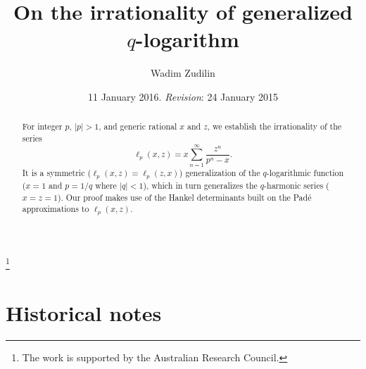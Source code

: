 \documentclass[12pt,reqno]{amsart}
\theoremstyle{remark}
\begin{document}
\title{On the irrationality of generalized $q$-logarithm}

\author{Wadim Zudilin}
\address{School of Mathematical and Physical Sciences, The University of Newcastle, Callaghan NSW 2308, AUSTRALIA}

\date{11 January 2016. \emph{Revision}: 24 January 2015}


\begin{abstract}
For integer $p$, $|p|>1$, and generic rational $x$ and $z$, we establish the irrationality of the series
$$
\ell_p(x,z)=x\sum_{n=1}^\infty\frac{z^n}{p^n-x}.
$$
It is a symmetric ($\ell_p(x,z)=\ell_p(z,x)$) generalization of the $q$-logarithmic function ($x=1$ and $p=1/q$ where $|q|<1$),
which in turn generalizes the $q$-harmonic series ($x=z=1$). Our proof makes use of the Hankel determinants built on the
Pad\'e approximations to $\ell_p(x,z)$.
\end{abstract}


\thanks{The work is supported by the Australian Research Council.}

\maketitle

\section{Historical notes}
\label{s1}
\end{document}
